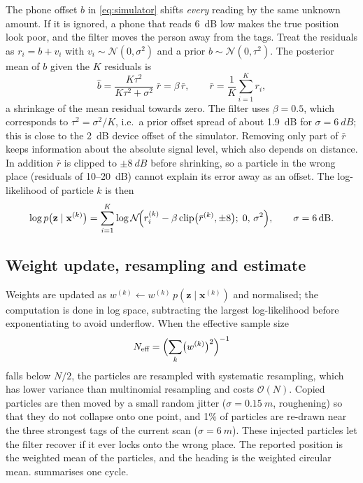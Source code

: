 \documentclass[11pt,a4paper]{article}
\begin{document}
The phone offset $b$ in \cref{eq:simulator} shifts \emph{every} reading by the same
unknown amount. If it is ignored, a phone that reads \SI{6}{dB} low makes the true
position look poor, and the filter moves the person away from the tags. Treat the
residuals as $r_i = b + v_i$ with $v_i\sim\mathcal{N}(0,\sigma^2)$ and a prior
$b\sim\mathcal{N}(0,\tau^2)$. The posterior mean of $b$ given the $K$ residuals is
\begin{equation}
  \hat b = \frac{K\tau^2}{K\tau^2+\sigma^2}\;\bar r = \beta\,\bar r,
  \qquad \bar r = \frac1K\sum_{i=1}^K r_i ,
  \label{eq:offset}
\end{equation}
a shrinkage of the mean residual towards zero. The filter uses $\beta=0.5$, which
corresponds to $\tau^2=\sigma^2/K$, i.e.\ a prior offset spread of about \SI{1.9}{dB}
for $\sigma=\SI{6}{dB}$; this is close to the \SI{2}{dB} device offset of the simulator.
Removing only part of $\bar r$ keeps information about the absolute signal level, which
also depends on distance. In addition $\bar r$ is clipped to $\pm\SI{8}{dB}$ before
shrinking, so a particle in the wrong place (residuals of 10--\SI{20}{dB}) cannot explain
its error away as an offset. The log-likelihood of particle $k$ is then
\begin{equation}
  \log p\bigl(\mathbf{z}\mid\mathbf{x}^{(k)}\bigr) =
  \sum_{i=1}^{K} \log \mathcal{N}\!\Bigl(r_i^{(k)} - \beta\,\mathrm{clip}\bigl(\bar r^{(k)}, \pm 8\bigr);\; 0,\, \sigma^2\Bigr),
  \qquad \sigma = \SI{6}{dB}.
  \label{eq:likelihood}
\end{equation}

\subsection{Weight update, resampling and estimate}
Weights are updated as $w^{(k)} \leftarrow w^{(k)}\,p(\mathbf{z}\mid\mathbf{x}^{(k)})$
and normalised; the computation is done in log space, subtracting the largest
log-likelihood before exponentiating to avoid underflow. When the effective sample size
\begin{equation}
  N_\text{eff} = \Bigl(\sum_k \bigl(w^{(k)}\bigr)^2\Bigr)^{-1}
\end{equation}
falls below $N/2$, the particles are resampled with systematic resampling, which has
lower variance than multinomial resampling and costs $\mathcal{O}(N)$. Copied particles
are then moved by a small random jitter ($\sigma=\SI{0.15}{m}$, roughening) so that they
do not collapse onto one point, and 1\% of particles are re-drawn near the three
strongest tags of the current scan ($\sigma=\SI{6}{m}$). These injected particles let the
filter recover if it ever locks onto the wrong place. The reported position is the
weighted mean of the particles, and the heading is the weighted circular mean.  summarises one cycle.
\end{document}
